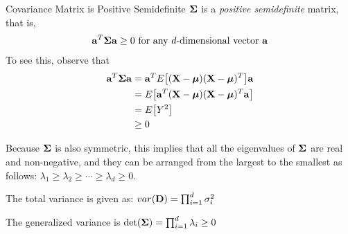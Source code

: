 \begin{frame}{Covariance Matrix is Positive Semidef\/{i}nite}
${\bm \Sigma}$ is a {\em positive semidef\/{i}nite}
matrix, that is,
\begin{align*}
    \mathbf{a}^T {\bm \Sigma} \mathbf{a} \ge 0
    \text{ for any $d$-dimensional vector } \mathbf{a}
\end{align*}
To see this, observe that
\begin{align*}
  \mathbf{a}^T {\bm \Sigma} \mathbf{a} & = \mathbf{a}^T E\bigl[(\mathbf{X}-{\bm \mu}) (\mathbf{X}-{\bm \mu})^T\bigr] \mathbf{a}\\
    & = E\bigl[\mathbf{a}^T (\mathbf{X}-{\bm \mu}) (\mathbf{X}-{\bm \mu})^T \mathbf{a}\bigr]\\
    & = E\bigl[Y^2\bigr]\\
    & \ge 0
  \end{align*}

\medskip
Because
${\bm \Sigma}$ is also symmetric, this implies that
all the eigenvalues of ${\bm \Sigma}$ are real and non-negative,
and they can be arranged from the
largest to the smallest as follows: 
$\lambda_1 \ge \lambda_2 \ge \cdots
\ge \lambda_d \ge 0$.

\medskip
The total variance is given as: $var(\mathbf{D}) = \prod_{i=1}^d \sigma^2_i$

The generalized variance is
$\det({\bm \Sigma}) = \prod_{i=1}^d \lambda_i \ge 0$

\end{frame}


